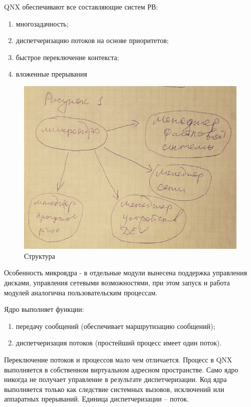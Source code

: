 QNX обеспечивают все составляющие систем РВ:
\begin{enumerate}
    \item многозадачность;
    \item диспетчеризацию потоков на основе приоритетов;
    \item быстрое переключение контекста;
    \item вложенные прерывания
\end{enumerate} 

\begin{figure}[H]
    \centering
    \includegraphics[width=\textwidth]{pic/1.png}
    \caption{Структура}
\end{figure}

Особенность микроядра - в отдельные модули вынесена поддержка управления дисками, управления  сетевыми возможностями, при этом запуск и работа модулей аналогична пользовательским процессам. 

Ядро выполняет функции:
\begin{enumerate}
    \item передачу сообщений (обеспечивает маршрутизацию сообщений);
    \item диспетчеризация потоков (простейший процесс имеет один поток).
\end{enumerate} 

Переключение потоков и процессов мало чем отличается. 
Процесс в QNX выполняется в собственном виртуальном адресном пространстве. Само ядро никогда не получает управление в результате диспетчеризации. Код ядра выполняется только как следствие системных вызовов, исключений или аппаратных прерываний. Единица диспетчеризации – поток.

